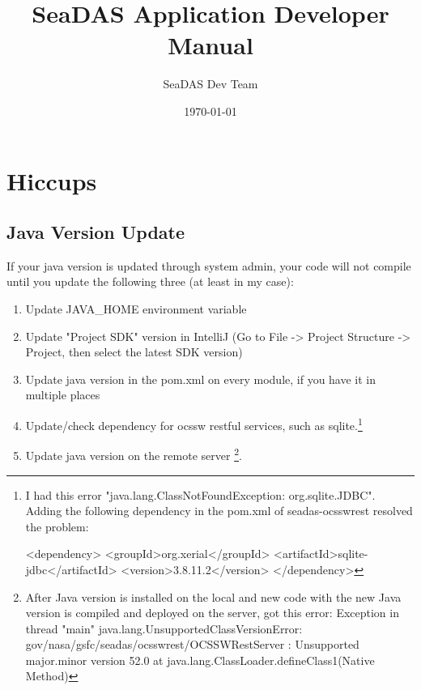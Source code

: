 \documentclass[11pt, oneside]{article}   	%
\title{SeaDAS Application Developer Manual}
\author{SeaDAS Dev Team}
\date{\today}							%
\begin{document}
\maketitle

\section{Hiccups}
\subsection{Java Version Update}
If your java version is updated through system admin, your code will not compile until you update the following three (at least in my case):
\begin{enumerate}
\item Update JAVA_HOME environment variable
\item Update "Project SDK" version in IntelliJ (Go to File -> Project Structure -> Project, then select the latest SDK version)
\item Update java version in the pom.xml on every module, if you have it in multiple places
\item Update/check dependency for ocssw restful services, such as sqlite.\footnote{I had this error "java.lang.ClassNotFoundException: org.sqlite.JDBC".
                                                                                   Adding the following dependency in the pom.xml of seadas-ocsswrest resolved the problem:

                                                                                           <dependency>
                                                                                               <groupId>org.xerial</groupId>
                                                                                               <artifactId>sqlite-jdbc</artifactId>
                                                                                               <version>3.8.11.2</version>
                                                                                           </dependency>}
\item Update java version on the remote server \footnote{After Java version is installed on the local and new code with the new Java version is compiled and deployed on the server, got this error:
﻿Exception in thread "main" java.lang.UnsupportedClassVersionError: gov/nasa/gsfc/seadas/ocsswrest/OCSSWRestServer : Unsupported major.minor version 52.0
	at java.lang.ClassLoader.defineClass1(Native Method)
}.

\end{enumerate}
\end{document}
